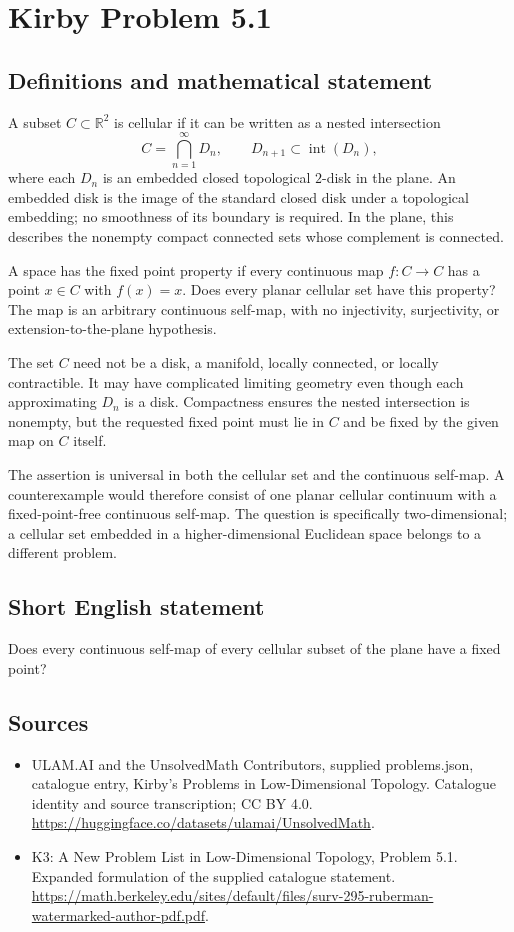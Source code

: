 \documentclass[11pt,a4paper]{article}
\begin{document}
\section*{Kirby Problem 5.1}\label{statement}

\subsection{Definitions and mathematical statement}
A subset $C\subset\mathbb R^2$ is cellular if it can be written
as a nested intersection
\[
 C=\bigcap_{n=1}^{\infty}D_n,\qquad
 D_{n+1}\subset\operatorname{int}(D_n),
\]
where each $D_n$ is an embedded closed topological $2$-disk in
the plane. An embedded disk is the image of the standard closed
disk under a topological embedding; no smoothness of its boundary
is required. In the plane, this describes the nonempty compact
connected sets whose complement is connected.

A space has the fixed point property if every continuous map
$f:C\to C$ has a point $x\in C$ with $f(x)=x$.
Does every planar cellular set have this property? The map is
an arbitrary continuous self-map, with no injectivity, surjectivity,
or extension-to-the-plane hypothesis.

The set $C$ need not be a disk, a manifold, locally connected,
or locally contractible. It may have complicated limiting geometry
even though each approximating $D_n$ is a disk. Compactness
ensures the nested intersection is nonempty, but the requested
fixed point must lie in $C$ and be fixed by the given map on
$C$ itself.

The assertion is universal in both the cellular set and the
continuous self-map. A counterexample would therefore consist of
one planar cellular continuum with a fixed-point-free continuous
self-map. The question is specifically two-dimensional; a cellular
set embedded in a higher-dimensional Euclidean space belongs to
a different problem.
\subsection{Short English statement}
Does every continuous self-map of every cellular subset of the plane have a fixed point?
\subsection{Sources}
\begin{itemize}
\item[S1] ULAM.AI and the UnsolvedMath Contributors, supplied problems.json, catalogue entry, Kirby's Problems in Low-Dimensional Topology. Catalogue identity and source transcription; CC BY 4.0.
\url{https://huggingface.co/datasets/ulamai/UnsolvedMath}.
\item[S2] K3: A New Problem List in Low-Dimensional Topology, Problem 5.1. Expanded formulation of the supplied catalogue statement.
\url{https://math.berkeley.edu/sites/default/files/surv-295-ruberman-watermarked-author-pdf.pdf}.
\end{itemize}
\end{document}
